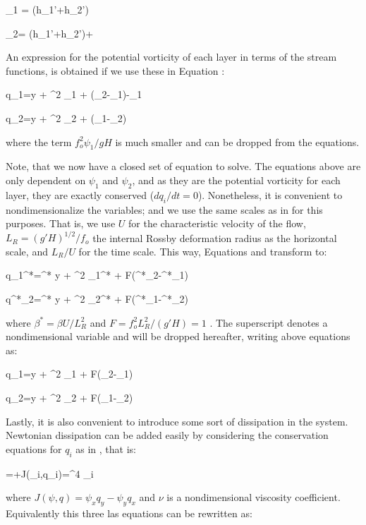 \beq
\psi _1 =  (h_1'+h_2')

\beq
\psi _2=  (h_1'+h_2')+

An expression for the potential vorticity of each layer in terms of the stream functions, is obtained if we use these in Equation :

\beq
q_1=\beta y + \nabla^2 \psi_1 + (\psi_2-\psi_1)-\psi_1

\beq
q_2=\beta y + \nabla^2 \psi_2 + (\psi_1-\psi_2)

where the term $f_o^2 \psi_1/gH$ is much smaller and can be dropped from the equations.

Note, that we now have a closed set of equation to solve. The equations above are only dependent on $\psi_1$ and $\psi_2$, and as they are the potential vorticity for each layer, they are exactly conserved ($d q_i/dt=0$). Nonetheless, it is convenient to nondimensionalize the variables; and we use the same scales as in  for this purposes. That is, we use $U$ for the characteristic velocity of the flow, $L_R=(g'H)^{1/2}/f_o$ the internal Rossby deformation radius as the horizontal scale, and $L_R/U$ for the time scale. This way, Equations  and  transform to:

\beq
q_1^*=\beta^* y + \nabla^2 \psi_1^* + F(\psi^*_2-\psi^*_1)

\beq
q^*_2=\beta^* y + \nabla^2 \psi_2^* + F(\psi^*_1-\psi^*_2)

where $\beta^*=\beta U / L_R^2$ and $F=f_o^2 L_R^2 /(g'H) = 1$ . The superscript denotes a nondimensional variable and will be dropped hereafter, writing above equations as:

\beq
q_1=\beta y + \nabla^2 \psi_1 + F(\psi_2-\psi_1)

\beq
q_2=\beta y + \nabla^2 \psi_2 + F(\psi_1-\psi_2)

Lastly, it is also convenient to introduce some sort of dissipation in the system. Newtonian dissipation can be added easily by considering the conservation equations for $q_i$ as in , that is:

\beq
{}=+J(\psi_i,q_i)=\nu \nabla^4 \psi_i

where $J(\psi,q)=\psi_x q_y - \psi_y q_x$ and $\nu$ is a nondimensional viscosity coefficient. Equivalently this three las equations can be rewritten as:

